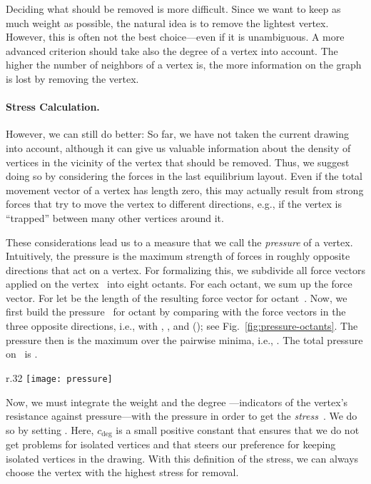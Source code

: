 \documentclass[]{llncs}
\newcommand{\cdeg}{\ensuremath{c_{\deg}}\xspace}
\begin{document}
Deciding what should be removed is more difficult. Since we
want to keep as much weight as possible, the natural idea is to
remove the lightest vertex. However, this is often not the best
choice---even if it is unambiguous. A more advanced
criterion should take also the degree of a vertex into account. The
higher the number of neighbors of a vertex is, the more information on
the graph is lost by removing the vertex.


\paragraph{Stress Calculation.}
However, we can still do better: So far, we have not taken the current
drawing into account, although it can give us valuable information
about the density of vertices in the vicinity of the vertex that
should be removed. Thus, we suggest doing so by considering the forces
in the last equilibrium layout. Even if the total movement vector of a
vertex has length zero, this may actually result from strong forces
that try to move the vertex to different directions, e.g., if the
vertex is ``trapped'' between many other vertices around it.

These considerations lead us to a measure that we call the
\emph{pressure} of a vertex. Intuitively, the pressure is the maximum
strength of forces in roughly opposite directions that act on a
vertex. For formalizing this, we subdivide all force vectors applied
on the vertex~ into eight octants. For each
octant, we sum up the force vector. For  let
 be the length of the resulting force vector for octant~.
Now, we first build the pressure~ for octant  by comparing  with
the force vectors in the three opposite directions, i.e., with
, , and  (); see
Fig.~\ref{fig:pressure-octants}.
The pressure then is
the maximum over the pairwise minima, i.e., . The total
pressure on~ is .

\begin{wrapfigure}[12]{r}{.32\textwidth}
	\centering
	\texttt{[image: pressure]}
	\caption{Pressure computation for one of the octants.}
	\label{fig:pressure-octants}
\end{wrapfigure}
Now, we must integrate the weight  and the degree
---indicators of the vertex's resistance against
pressure---with the pressure in order to get the \emph{stress}~.
We do so by setting . Here, \cdeg is a small positive constant that ensures that
we do not get problems for isolated vertices and that steers our preference
for keeping isolated vertices in the drawing. With this definition of the stress, we
can always choose the vertex with the highest stress for removal.
\end{document}
